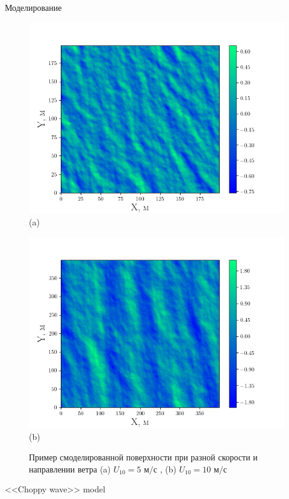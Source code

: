 \begin{frame}[t]{}
\begin{columns}[t]
\begin{column}{.48\linewidth}
\begin{block}{Моделирование}
\begin{figure}[h]
\begin{minipage}{0.45\linewidth}
                \includegraphics[width=\linewidth]{fig/water5.png}
                \centering
                (a)
            \end{minipage}
            \begin{minipage}{0.45\linewidth}
                \includegraphics[width=\linewidth]{fig/water10}
                \centering
                (b)
            \end{minipage}
            \caption{Пример смоделированной поверхности при разной скорости и направлении ветра (a) $U_{10} = 5 \text{ м/с }$, (b) $U_{10} = 10 \text{ м/с}$}
        \end{figure}
        \end{block}
        \begin{block}{<<Choppy wave>> model}

\end{block}
\end{column}
\end{columns}
\end{frame}
